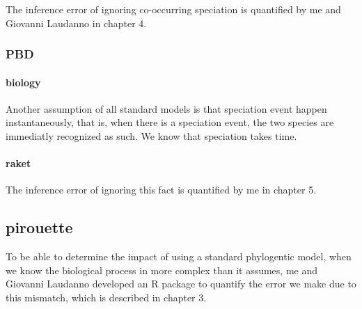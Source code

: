 {The inference error of ignoring co-occurring speciation is quantified by
me and Giovanni Laudanno in chapter 4.

\subsubsection{PBD}

\paragraph{biology}

Another assumption of all standard models is that speciation event happen
instantaneously, that is, when there is a speciation event, the two species
are immediatly recognized as such. We know that speciation takes
time. 


\paragraph{raket}

The inference error of ignoring this fact is quantified by
me in chapter 5.


\subsection{pirouette}

To be able to determine the impact of using a standard phylogentic
model, when we know the biological process in more complex than it
assumes, me and Giovanni Laudanno developed an R package 
to quantify the error we make due to this mismatch, which is described
in chapter 3.

}
